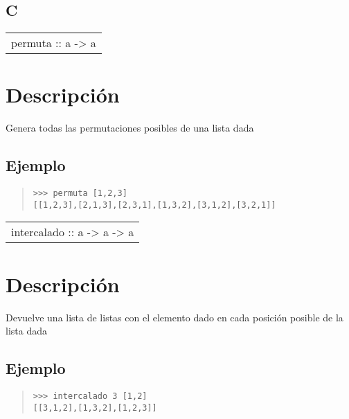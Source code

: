 \subsection{C}
\begin{haddockdesc}
\item[\begin{tabular}{@{}l}
permuta :: {\char 91}a{\char 93} -> {\char 91}{\char 91}a{\char 93}{\char 93}
\end{tabular}]
{\haddockbegindoc
\section*{Descripción}
Genera todas las permutaciones posibles de una lista dada\par
\subsection*{Ejemplo}
\begin{quote}
{\haddockverb\begin{verbatim}
>>> permuta [1,2,3]
[[1,2,3],[2,1,3],[2,3,1],[1,3,2],[3,1,2],[3,2,1]]

\end{verbatim}}
\end{quote}}
\end{haddockdesc}
\begin{haddockdesc}
\item[\begin{tabular}{@{}l}
intercalado :: a -> {\char 91}a{\char 93} -> {\char 91}{\char 91}a{\char 93}{\char 93}
\end{tabular}]
{\haddockbegindoc
\section*{Descripción}
Devuelve una lista de listas con el elemento dado en cada posición posible de la lista dada\par
\subsection*{Ejemplo}
\begin{quote}
{\haddockverb\begin{verbatim}
>>> intercalado 3 [1,2]
[[3,1,2],[1,3,2],[1,2,3]]

\end{verbatim}}
\end{quote}}
\end{haddockdesc}

